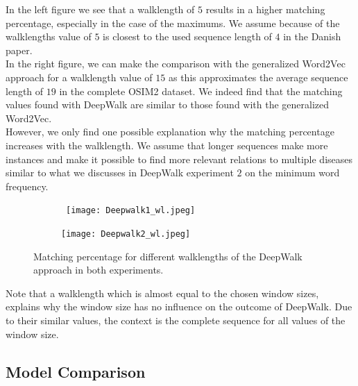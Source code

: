 In the left figure we see that a walklength of $5$ results in a higher matching percentage, especially in the case of the maximums. We assume because of the walklengths value of $5$ is closest to the used sequence length of $4$ in the Danish paper. \\

In the right figure, we can make the comparison with the generalized Word2Vec approach for a walklength value of $15$ as this approximates the average sequence length of $19$ in the complete OSIM2 dataset. We indeed find that the matching values found with DeepWalk are similar to those found with the generalized Word2Vec. \\
However, we only find one possible explanation why the matching percentage increases with the walklength. We assume that longer sequences make more instances and make it possible to find more relevant relations to multiple diseases similar to what we discusses in DeepWalk experiment $2$ on the minimum word frequency. \\

\begin{figure}[!htb]
	\centering
	\begin{subfigure}[b]{.49\textwidth}\
		\texttt{[image: Deepwalk1\_wl.jpeg]}
	\end{subfigure}
	\begin{subfigure}[b]{.49\textwidth}
		\texttt{[image: Deepwalk2\_wl.jpeg]}
	\end{subfigure}
	\caption{Matching percentage for different walklengths of the DeepWalk approach in both experiments.}
	\label{fig:dw_wl}
\end{figure}

Note that a walklength which is almost equal to the chosen window sizes, explains why the window size has no influence on the outcome of DeepWalk. Due to their similar values, the context is the complete sequence for all values of the window size.


\subsection{Model Comparison}

